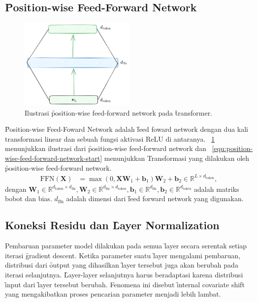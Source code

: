 \subsection{\f{Position-wise Feed-Forward Network}}
	\begin{figure}
		\centering
		\includegraphics[width=0.5\textwidth]{assets/pics/ffn_transformer.png}
		\caption{Ilustrasi \f{position-wise feed-forward network} pada \f{transformer}.}
		\label{fig:position-wise-feed-forward-network}
	\end{figure}
	\f{Position-wise Feed-Foward Network} adalah \f{feed foward network} dengan dua kali transformasi linear dan sebuah fungsi aktivasi ReLU di antaranya. \pic~\ref{fig:position-wise-feed-forward-network} menunjukkan ilustrasi dari \f{position-wise feed-forward network} dan \equ~\ref{equ:position-wise-feed-forward-network-start} menunjukkan Transformasi yang dilakukan oleh \f{position-wise feed-forward network}.
	\begin{align}
		\label{equ:position-wise-feed-forward-network-start}
		\text{FFN}(\mathbf{X}) &= \max(0, \mathbf{X}\mathbf{W}_1 + \mathbf{b}_1)\mathbf{W}_2 + \mathbf{b}_2 \in \mathbb{R}^{L \times d_{\text{token}}},
	\end{align}
	dengan $\mathbf{W}_1 \in \mathbb{R}^{d_{\text{token}} \times d_{\text{ffn}}}, \mathbf{W}_2 \in \mathbb{R}^{d_{\text{ffn}} \times d_{\text{token}}}, \mathbf{b}_1 \in \mathbb{R}^{d_{\text{ffn}}}, \mathbf{b}_2 \in \mathbb{R}^{d_{\text{token}}}$ adalah matriks bobot dan bias. $d_{\text{ffn}}$ adalah dimensi dari \f{feed forward network} yang digunakan.

	\subsection{Koneksi Residu dan \f{Layer Normalization}}
	\label{sec:layer-normalization}

	Pembaruan parameter model dilakukan pada semua \f{layer} secara serentak setiap iterasi \f{gradient descent}. Ketika parameter suatu \f{layer} mengalami pembaruan, distribusi dari \f{output} yang dihasilkan \f{layer} tersebut juga akan berubah pada iterasi selanjutnya. \f{Layer-layer} selanjutnya harus beradaptasi karena distribusi \f{input} dari \f{layer} tersebut berubah. Fenomena ini disebut \f{internal covariate shift} yang mengakibatkan proses pencarian parameter menjadi lebih lambat.
	
